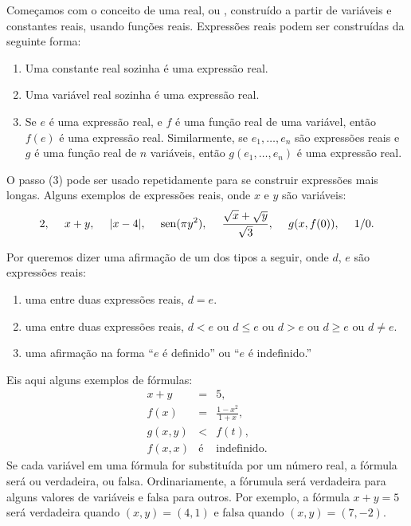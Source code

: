 \documentclass{svmono}
\begin{document}
Começamos com o conceito de uma  real, ou ,
construído a partir de variáveis e constantes reais, usando funções reais.
Expressões reais podem ser construídas da seguinte forma:
\begin{enumerate}[(1)]
\item Uma constante real sozinha é uma expressão real.
\item Uma variável real sozinha é uma expressão real.
\item Se $e$ é uma expressão real, e $f$ é uma função real de uma variável,
      então $f(e)$ é uma expressão real. Similarmente, se $e_1, \ldots, e_n$
      são expressões reais e $g$ é uma função real de $n$ variáveis, então
      $g(e_1, \ldots, e_n)$ é uma expressão real.
\end{enumerate}

O passo (3) pode ser usado repetidamente para se construir expressões
mais longas. Alguns exemplos de expressões reais, onde $x$ e $y$ são
variáveis:
\[
2, \hspace{3ex} x+y, \hspace{3ex} |x-4|, \hspace{3ex} \operatorname{sen}(\pi y^2),
\hspace{3ex} \frac{\sqrt{x} + \sqrt{y}}{\sqrt{3}}, \hspace{3ex} g(x,f(0)),
\hspace{3ex} 1/0.
\]

Por  queremos dizer uma afirmação de um dos tipos a seguir,
onde $d$, $e$ são expressões reais:
\begin{enumerate}[(1)]
\item uma  entre duas expressões reais, $d = e$.
\item uma  entre duas expressões reais, $d < e$ ou
      $d \le e$ ou $d > e$ ou $d \ge e$ ou $d \ne e$.
\item uma afirmação na forma ``$e$ é definido'' ou ``$e$ é indefinido.''
\end{enumerate}
Eis aqui alguns exemplos de fórmulas:
\begin{eqnarray*}
  x + y & = & 5, \\
  f(x)  & = & \frac{1 - x^2}{1 + x}, \\
 g(x,y) & < & f(t), \\
 f(x,x) & \text{é} & \text{indefinido}.
\end{eqnarray*}
Se cada variável em uma fórmula for substituída por um número real, a
fórmula será ou verdadeira, ou falsa. Ordinariamente, a fórumula será
verdadeira para alguns valores de variáveis e falsa para outros. Por
exemplo, a fórmula $x+y = 5$ será verdadeira quando $(x,y) = (4,1)$
e falsa quando $(x,y) = (7,-2)$.
\end{document}
